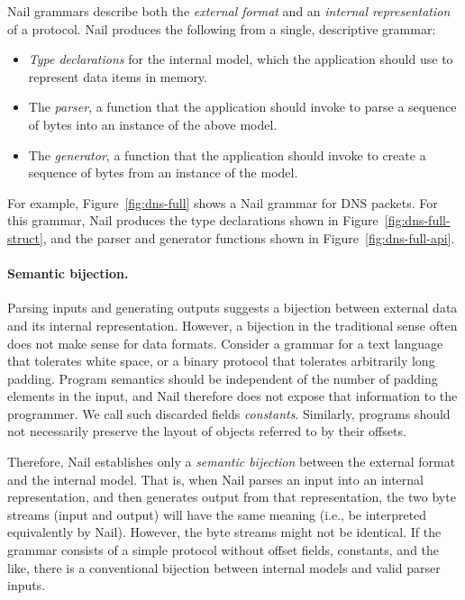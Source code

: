 Nail grammars describe both the \emph{external format} and an
\emph{internal representation} of a protocol.
Nail produces the following from a single, descriptive grammar: 

\begin{itemize}
\item \textit{Type declarations} for the internal model, which
the application should use to represent data items in memory.

\item The \textit{parser}, a function that the application
should invoke to parse a sequence of bytes into an instance
of the above model.

\item The \textit{generator}, a function that the application
should invoke to create a sequence of bytes from an instance
of the model.
\end{itemize}

For example, Figure~\ref{fig:dns-full} shows a Nail grammar for DNS
packets.  For this grammar, Nail produces the type declarations
shown in Figure~\ref{fig:dns-full-struct}, and the parser and
generator functions shown in Figure~\ref{fig:dns-full-api}.




\noindent

\paragraph{Semantic bijection.}
Parsing inputs and generating outputs suggests a bijection
between external data and its internal representation. However,
a bijection in the traditional sense often does not make sense for data
formats. Consider a grammar for a text language that tolerates white space, or a binary protocol
that tolerates arbitrarily long padding. Program semantics should be independent of the number of padding elements in the input, and Nail therefore
does not expose that information to the programmer. We call such discarded fields \emph{constants}. 
Similarly, programs should not necessarily preserve the layout of objects referred to by their offsets. 

Therefore, Nail  establishes only a  \emph{semantic bijection} between the external format and the internal model.
That is, when Nail parses an input into an internal representation, and then
generates output from that representation, the two byte streams (input and
output) will have the same meaning (i.e., be interpreted equivalently by Nail).
However, the byte streams might not be identical. If the grammar
consists of a simple protocol without offset fields, constants, and the like, there is a
conventional bijection between  internal models and valid parser inputs.
 

